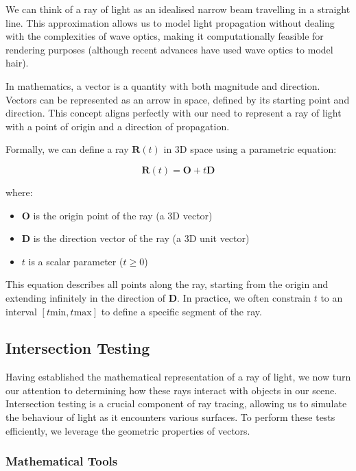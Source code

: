 \documentclass[12pt]{article}
\begin{document}
We can think of a ray of light as an idealised narrow beam travelling in a straight line. This approximation allows us to model light propagation without dealing with the complexities of wave optics, making it computationally feasible for rendering purposes (although recent advances have used wave optics to model hair\cite{hair}).

In mathematics, a vector is a quantity with both magnitude and direction. Vectors can be represented as an arrow in space, defined by its starting point and direction. This concept aligns perfectly with our need to represent a ray of light with a point of origin and a direction of propagation.

Formally, we can define a ray \(\mathbf{R}(t)\) in 3D space using a parametric equation:

\[
    \mathbf{R}(t) = \mathbf{O} + t\mathbf{D}
\]

where:
\begin{itemize}
    \item \(\mathbf{O}\) is the origin point of the ray (a 3D vector)
    \item \(\mathbf{D}\) is the direction vector of the ray (a 3D unit vector)
    \item \(t\) is a scalar parameter (\(t \geq 0\))
\end{itemize}

This equation describes all points along the ray, starting from the origin and extending infinitely in the direction of \(\mathbf{D}\). In practice, we often constrain \(t\) to an interval \([t{\text{min}}, t{\text{max}}]\) to define a specific segment of the ray.

\subsection{Intersection Testing}

Having established the mathematical representation of a ray of light, we now turn our attention to determining how these rays interact with objects in our scene. Intersection testing is a crucial component of ray tracing, allowing us to simulate the behaviour of light as it encounters various surfaces. To perform these tests efficiently, we leverage the geometric properties of vectors.

\subsubsection{Mathematical Tools}
\end{document}
